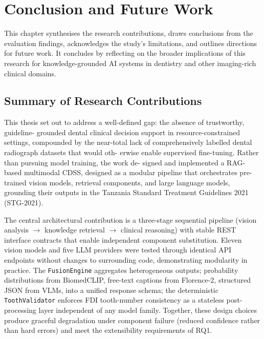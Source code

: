 \documentclass[12pt,a4paper]{report}
\begin{document}
	\chapter{Conclusion and Future Work}
	\label{chap:conclusion}
	
	This chapter synthesises the research contributions, draws conclusions from
	the evaluation findings, acknowledges the study's limitations, and outlines
	directions for future work. It concludes by reflecting on the broader
	implications of this research for knowledge-grounded AI systems in dentistry
	and other imaging-rich clinical domains.
	
	\section{Summary of Research Contributions}
	\label{sec:conclusion_contributions}
	
	This thesis set out to address a well-defined gap: the absence of trustworthy, guideline-
	grounded dental clinical decision support in resource-constrained settings, compounded by
	the near-total lack of comprehensively labelled dental radiograph datasets that would oth-
	erwise enable supervised fine-tuning. Rather than pursuing model training, the work de-
	signed and implemented a RAG-based multimodal CDSS, designed as a modular pipeline
	that orchestrates pre-trained vision models, retrieval components, and large language models,
	grounding their outputs in the Tanzania Standard Treatment Guidelines 2021 (STG-2021).
	
	The central architectural contribution is a three-stage sequential pipeline
	(vision analysis $\rightarrow$ knowledge retrieval $\rightarrow$ clinical
	reasoning) with stable REST interface contracts that enable independent component
	substitution. Eleven vision models and five LLM providers were tested through
	identical API endpoints without changes to surrounding code, demonstrating
	modularity in practice. The \texttt{FusionEngine} aggregates heterogeneous
	outputs; probability distributions from BiomedCLIP, free-text captions from
	Florence-2, structured JSON from VLMs, into a unified response schema; the
	deterministic \texttt{ToothValidator} enforces FDI tooth-number consistency as
	a stateless post-processing layer independent of any model family. Together,
	these design choices produce graceful degradation under component failure
	(reduced confidence rather than hard errors) and meet the extensibility
	requirements of RQ1.
	
\end{document}
